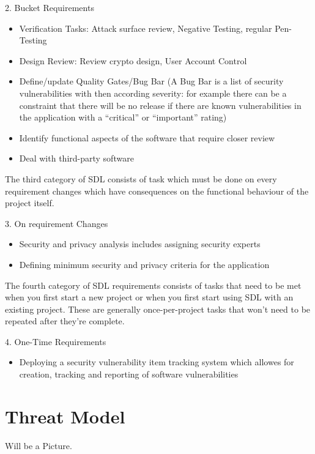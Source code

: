 2. Bucket Requirements
\begin{itemize}
	\item Verification Tasks: Attack surface review, Negative Testing, regular Pen-Testing
	\item Design Review: Review crypto design, User Account Control
	\item Define/update Quality Gates/Bug Bar (A Bug Bar is a list of security vulnerabilities with then according severity: for example there can be a constraint that there will be no release if there are known vulnerabilities in the application with a ``critical'' or ``important'' rating)
	\item Identify functional aspects of the software that require closer review
	\item Deal with third-party software
\end{itemize}

The third category of SDL consists of task which must be done on every requirement changes which have consequences on the functional behaviour of the project itself. 

3. On requirement Changes

\begin{itemize}
	\item Security and privacy analysis includes assigning security experts
	\item Defining minimum security and privacy criteria for the application
\end{itemize}

The fourth category of SDL requirements consists of tasks that need to be met when you first start a new project or when you first start using SDL with an existing project. These are generally once-per-project tasks that won’t need to be repeated after they’re complete.

4. One-Time Requirements
\begin{itemize}
	\item Deploying a security vulnerability item tracking system which allowes for creation, tracking and reporting of software vulnerabilities
\end{itemize}


\section{Threat Model}
Will be a Picture.

